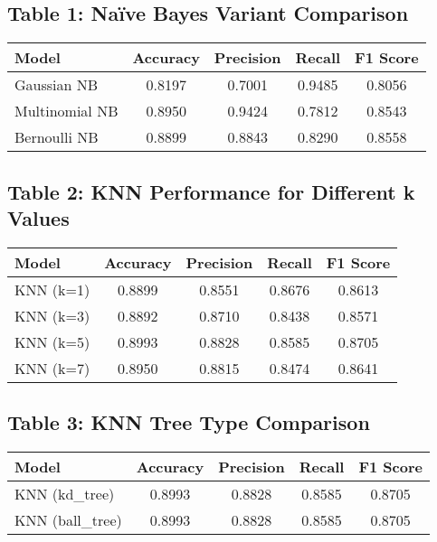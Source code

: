 \documentclass[12pt]{article}
\begin{document}
\subsection*{Table 1: Naïve Bayes Variant Comparison}
\begin{center}
\begin{tabular}{lcccc}
\toprule
\textbf{Model} & \textbf{Accuracy} & \textbf{Precision} & \textbf{Recall} & \textbf{F1 Score} \\
\midrule
Gaussian NB     & 0.8197 & 0.7001 & 0.9485 & 0.8056 \\
Multinomial NB  & 0.8950 & 0.9424 & 0.7812 & 0.8543 \\
Bernoulli NB    & 0.8899 & 0.8843 & 0.8290 & 0.8558 \\
\bottomrule
\end{tabular}
\end{center}

\vspace{1em}

\subsection*{Table 2: KNN Performance for Different k Values}
\begin{center}
\begin{tabular}{lcccc}
\toprule
\textbf{Model} & \textbf{Accuracy} & \textbf{Precision} & \textbf{Recall} & \textbf{F1 Score} \\
\midrule
KNN (k=1) & 0.8899 & 0.8551 & 0.8676 & 0.8613 \\
KNN (k=3) & 0.8892 & 0.8710 & 0.8438 & 0.8571 \\
KNN (k=5) & 0.8993 & 0.8828 & 0.8585 & 0.8705 \\
KNN (k=7) & 0.8950 & 0.8815 & 0.8474 & 0.8641 \\
\bottomrule
\end{tabular}
\end{center}

\vspace{1em}

\subsection*{Table 3: KNN Tree Type Comparison}
\begin{center}
\begin{tabular}{lcccc}
\toprule
\textbf{Model} & \textbf{Accuracy} & \textbf{Precision} & \textbf{Recall} & \textbf{F1 Score} \\
\midrule
KNN (kd\_tree)   & 0.8993 & 0.8828 & 0.8585 & 0.8705 \\
KNN (ball\_tree) & 0.8993 & 0.8828 & 0.8585 & 0.8705 \\
\bottomrule
\end{tabular}
\end{center}
\end{document}
